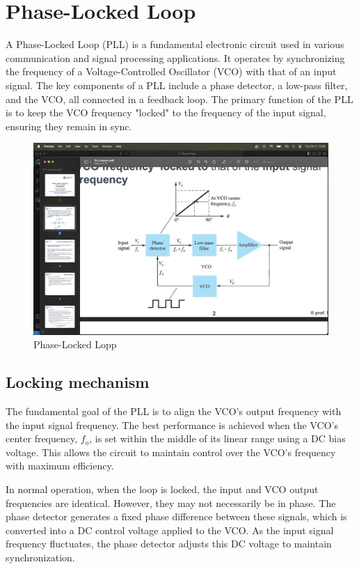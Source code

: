 \section{Phase-Locked Loop}

A Phase-Locked Loop (PLL) is a fundamental electronic circuit used in various communication and signal processing applications.
It operates by synchronizing the frequency of a Voltage-Controlled Oscillator (VCO) with that of an input signal.
The key components of a PLL include a phase detector, a low-pass filter, and the VCO, all connected in a feedback loop. 
The primary function of the PLL is to keep the VCO frequency "locked" to the frequency of the input signal, ensuring they remain in sync.
\begin{figure}[H]
    \centering
    \includegraphics[width=0.75\linewidth]{images/pll.png}
    \caption{Phase-Locked Lopp}
\end{figure}

\subsection{Locking mechanism}
The fundamental goal of the PLL is to align the VCO's output frequency with the input signal frequency. 
The best performance is achieved when the VCO's center frequency, $f_{{o}}$, is set within the middle of its linear range using a DC bias voltage.
This allows the circuit to maintain control over the VCO's frequency with maximum efficiency.

In normal operation, when the loop is locked, the input and VCO output frequencies are identical. 
However, they may not necessarily be in phase. 
The phase detector generates a fixed phase difference between these signals, which is converted into a DC control voltage applied to the VCO. 
As the input signal frequency fluctuates, the phase detector adjusts this DC voltage to maintain synchronization.

